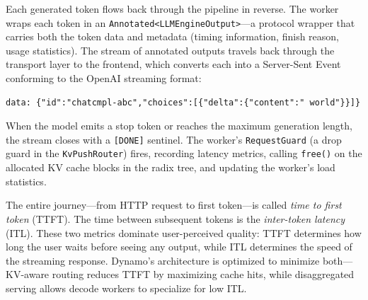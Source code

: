 Each generated token flows back through the pipeline in reverse. The worker wraps each token in an \texttt{Annotated<LLMEngineOutput>}---a protocol wrapper that carries both the token data and metadata (timing information, finish reason, usage statistics). The stream of annotated outputs travels back through the transport layer to the frontend, which converts each into a Server-Sent Event conforming to the OpenAI streaming format:

\begin{verbatim}
data: {"id":"chatcmpl-abc","choices":[{"delta":{"content":" world"}}]}
\end{verbatim}

When the model emits a stop token or reaches the maximum generation length, the stream closes with a \texttt{[DONE]} sentinel. The worker's \texttt{RequestGuard} (a drop guard in the \texttt{KvPushRouter}) fires, recording latency metrics, calling \texttt{free()} on the allocated KV cache blocks in the radix tree, and updating the worker's load statistics.

\begin{notebox}
The entire journey---from HTTP request to first token---is called \emph{time to first token} (TTFT). The time between subsequent tokens is the \emph{inter-token latency} (ITL). These two metrics dominate user-perceived quality: TTFT determines how long the user waits before seeing any output, while ITL determines the speed of the streaming response. Dynamo's architecture is optimized to minimize both---KV-aware routing reduces TTFT by maximizing cache hits, while disaggregated serving allows decode workers to specialize for low ITL.
\end{notebox}


